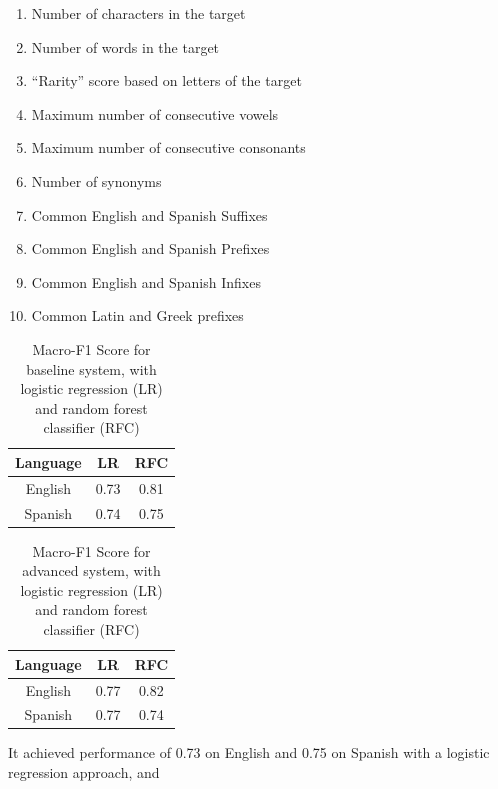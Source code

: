 \documentclass[11pt,a4paper]{article}
\begin{document}
\begin{enumerate}
\itemsep0em
\item Number of characters in the target
\item Number of words in the target
\item \enquote{Rarity} score based on letters of the target
\item Maximum number of consecutive vowels
\item Maximum number of consecutive consonants
\item Number of synonyms
\item Common English and Spanish Suffixes
\item Common English and Spanish Prefixes
\item Common English and Spanish Infixes
\item Common Latin and Greek prefixes
\end{enumerate}

\begin{table}[h]
\begin{center}
\begin{tabular}{|c|c|c|}
\hline
\textbf{Language} & \textbf{LR} & \textbf{RFC} \\
\hline
English & 0.73 & 0.81 \\ \hline
Spanish & 0.74 & 0.75 \\ \hline
\end{tabular}
\caption{Macro-F1 Score for baseline system, with logistic regression (LR) and random forest classifier (RFC)}
\label{tab:baseline}
\end{center}
\end{table}

\begin{table}[h]
\begin{center}
\begin{tabular}{|c|c|c|}
\hline
\textbf{Language} & \textbf{LR} & \textbf{RFC} \\
\hline
English & 0.77 & 0.82 \\ \hline
Spanish & 0.77 & 0.74 \\ \hline
\end{tabular}
\caption{Macro-F1 Score for advanced system, with logistic regression (LR) and random forest classifier (RFC)}
\label{tab:advanced}
\end{center}
\end{table}

It achieved performance of 0.73 on English and 0.75 on Spanish with a logistic regression approach, and
\end{document}
